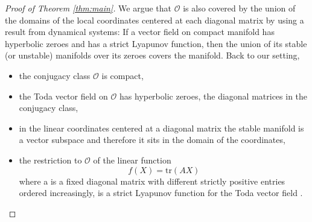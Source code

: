 \documentclass[reqno]{amsart}
\newcommand{\cO}{\mathcal{O}}
\theoremstyle{definition} %
\begin{document}
\begin{proof}[Proof of Theorem \ref{thm:main}]
We argue that
$\cO$ is also covered by the union of the domains of the local coordinates centered at each diagonal matrix by using a result from dynamical systems: If a vector field on compact manifold has hyperbolic zeroes and has a strict Lyapunov function, then the union of its stable (or unstable) manifolds over its zeroes covers the manifold. Back to our setting,
\begin{itemize}
 \item the conjugacy class $\cO$ is compact,
 \item the Toda vector field on $\cO$ has hyperbolic zeroes, the diagonal matrices in the conjugacy class,
 \item  in the linear coordinates centered at a diagonal matrix  the stable manifold is a vector subspace and therefore it sits in the domain of the coordinates,
 \item the restriction to $\cO$ of the linear function
 \[f(X)=\mathrm{tr}(AX)\]
 where a is a fixed diagonal matrix with different strictly positive entries ordered increasingly, is a strict Lyapunov function for the Toda vector field  \cite[Lemma 1]{Fa}.
\end{itemize}
\end{proof}
\end{document}
